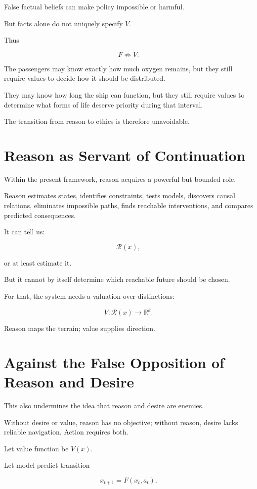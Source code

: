 \documentclass[11pt,oneside]{book}
\theoremstyle{definition}
\theoremstyle{remark}
\newcommand{\R}{\mathcal{R}}
\begin{document}
False factual beliefs can make policy impossible or harmful.

But facts alone do not uniquely specify \(V\).

Thus

\[
F\not\Rightarrow V.
\]

The passengers may know exactly how much oxygen remains, but they still require values to decide how it should be distributed.

They may know how long the ship can function, but they still require values to determine what forms of life deserve priority during that interval.

The transition from reason to ethics is therefore unavoidable.

\section{Reason as Servant of Continuation}

Within the present framework, reason acquires a powerful but bounded role.

Reason estimates states, identifies constraints, tests models, discovers causal relations, eliminates impossible paths, finds reachable interventions, and compares predicted consequences.

It can tell us:

\[
\R(x),
\]

or at least estimate it.

But it cannot by itself determine which reachable future should be chosen.

For that, the system needs a valuation over distinctions:

\[
V:\R(x)\rightarrow\mathbb R^k.
\]

Reason maps the terrain; value supplies direction.

\section{Against the False Opposition of Reason and Desire}

This also undermines the idea that reason and desire are enemies.

Without desire or value, reason has no objective; without reason, desire lacks reliable navigation. Action requires both.

Let value function be \(V(x)\).

Let model predict transition

\[
x_{t+1}=F(x_t,a_t).
\]
\end{document}
